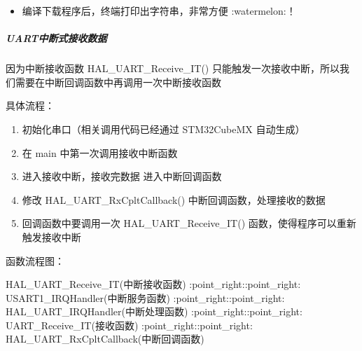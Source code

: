 \documentclass[a4paper,12pt,english]{sphinxmanual}
\begin{document}
\begin{sphinxVerbatim}[commandchars=\\\{\}]
\end{sphinxVerbatim}
\begin{itemize}
\item {} 
\sphinxAtStartPar
编译下载程序后，终端打印出字符串，非常方便 :watermelon:！

\end{itemize}

\sphinxAtStartPar
{}


\subparagraph{UART中断式接收数据}
\label{\detokenize{exp-stm32/peripherals-and-sensors:id10}}
\sphinxAtStartPar
因为中断接收函数 HAL\_UART\_Receive\_IT() 只能触发一次接收中断，所以我们需要在中断回调函数中再调用一次中断接收函数

\sphinxAtStartPar
具体流程：
\begin{enumerate}
%
\item {} 
\sphinxAtStartPar
初始化串口（相关调用代码已经通过 STM32CubeMX 自动生成）

\item {} 
\sphinxAtStartPar
在 main 中第一次调用接收中断函数

\item {} 
\sphinxAtStartPar
进入接收中断，接收完数据  进入中断回调函数

\item {} 
\sphinxAtStartPar
修改 HAL\_UART\_RxCpltCallback() 中断回调函数，处理接收的数据

\item {} 
\sphinxAtStartPar
回调函数中要调用一次 HAL\_UART\_Receive\_IT() 函数，使得程序可以重新触发接收中断

\end{enumerate}

\sphinxAtStartPar
函数流程图：

\sphinxAtStartPar
HAL\_UART\_Receive\_IT(中断接收函数) :point\_right::point\_right: USART1\_IRQHandler(中断服务函数) :point\_right::point\_right: HAL\_UART\_IRQHandler(中断处理函数) :point\_right::point\_right: UART\_Receive\_IT(接收函数) :point\_right::point\_right: HAL\_UART\_RxCpltCallback(中断回调函数)
\end{document}
